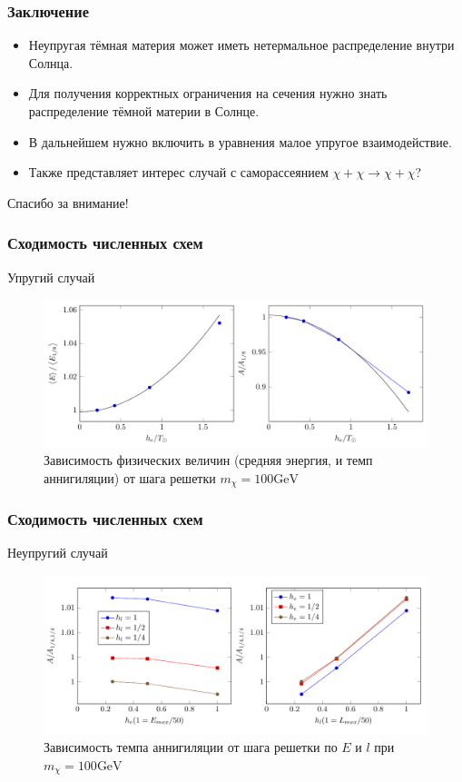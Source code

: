 \documentclass[
11pt,]{beamer}
\begin{document}
	\begin{frame}
		\frametitle{Заключение}
		\begin{itemize}
	\item Неупругая тёмная материя может иметь нетермальное распределение внутри Солнца.
	\item Для получения корректных ограничения на сечения нужно знать распределение тёмной материи в Солнце.
	\item В дальнейшем нужно включить в уравнения малое упругое взаимодействие.
	\item Также представляет интерес случай с саморассеянием $\chi + \chi \rightarrow \chi + \chi$?
	
\end{itemize}
	\end{frame}
	\begin{frame}
		\centering
Спасибо за внимание!
	\end{frame}
	
	\begin{frame}
		\frametitle{Сходимость численных схем}
		Упругий случай
\begin{figure}[!h]
	\centering
	\includegraphics[width=\textwidth]{images/ConvEl.png}
	\caption{Зависимость физических величин (средняя энергия, и темп аннигиляции) от шага решетки $m_{\chi} = 100 \text{GeV}$}
\end{figure}
	\end{frame}
	\begin{frame}
		\frametitle{Сходимость численных схем}
		Неупругий случай
\begin{figure}[!h]
	\centering
	\includegraphics[width=\textwidth]{images/ConvInel.png}
	\caption{Зависимость  темпа аннигиляции от шага решетки по $E$ и $l$ при $m_{\chi} = 100 \text{GeV}$}
\end{figure}
	\end{frame}
\end{document}
